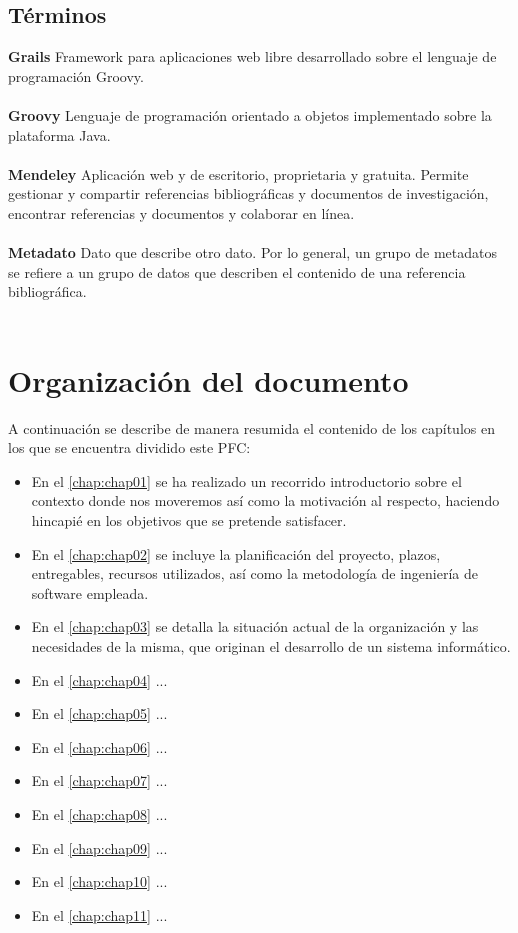 \subsection{Términos}
\textbf{Grails}	Framework para aplicaciones web libre desarrollado sobre el lenguaje de programación Groovy.\\\\
\textbf{Groovy}	Lenguaje de programación orientado a objetos implementado sobre la plataforma Java.\\\\
\textbf{Mendeley}	Aplicación web y de escritorio, proprietaria y gratuita. Permite gestionar y compartir referencias bibliográficas y documentos de investigación, encontrar referencias y documentos y colaborar en línea.\\\\
\textbf{Metadato}	Dato que describe otro dato. Por lo general, un grupo de metadatos se refiere a un grupo de datos que describen el contenido de una referencia bibliográfica.\\\\

\section{Organización del documento}
A continuación se describe de manera resumida el contenido de los capítulos en los que se encuentra dividido este PFC:

\begin{itemize}
	\item En el \autoref{chap:chap01} se ha realizado un recorrido introductorio sobre el contexto donde nos moveremos así como la motivación al respecto, haciendo hincapié en los objetivos que se pretende satisfacer.
	\item En el \autoref{chap:chap02} se incluye la planificación del proyecto, plazos, entregables, recursos utilizados, así como la metodología de ingeniería de software empleada.
	\item En el \autoref{chap:chap03} se detalla la situación actual de la organización y las necesidades de la misma, que originan el desarrollo de un sistema informático.
	\item En el \autoref{chap:chap04} ...
	\item En el \autoref{chap:chap05} ...
	\item En el \autoref{chap:chap06} ...
	\item En el \autoref{chap:chap07} ...
	\item En el \autoref{chap:chap08} ...
	\item En el \autoref{chap:chap09} ...
	\item En el \autoref{chap:chap10} ...
	\item En el \autoref{chap:chap11} ...
\end{itemize}

